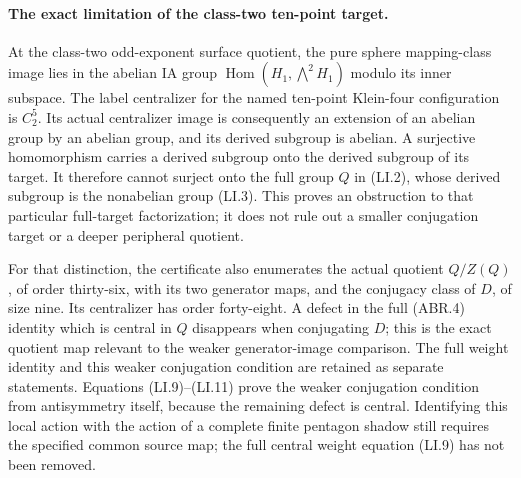 \paragraph{The exact limitation of the class-two ten-point target.}
At the class-two odd-exponent surface quotient, the pure
sphere mapping-class image lies in the abelian IA group
$\operatorname{Hom}(H_1,\bigwedge^2H_1)$ modulo its inner
subspace.  The label centralizer for the named ten-point
Klein-four configuration is $C_2^5$.  Its actual centralizer
image is consequently an extension of an abelian group by
an abelian group, and its derived subgroup is abelian.
A surjective homomorphism carries a derived subgroup onto
the derived subgroup of its target.  It therefore cannot
surject onto the full group $Q$ in (LI.2), whose derived
subgroup is the nonabelian group (LI.3).
This proves an obstruction to that particular full-target
factorization; it does not rule out a smaller conjugation
target or a deeper peripheral quotient.

For that distinction, the certificate also enumerates the
actual quotient $Q/Z(Q)$, of order thirty-six, with its two
generator maps, and the conjugacy class of $D$, of size nine.
Its centralizer has order forty-eight.  A defect in the full
(ABR.4) identity which is central in $Q$ disappears when
conjugating $D$; this is the exact quotient map relevant to
the weaker generator-image comparison.  The full weight
identity and this weaker conjugation condition are retained
as separate statements.  Equations (LI.9)--(LI.11) prove the
weaker conjugation condition from antisymmetry itself, because
the remaining defect is central.  Identifying this local
action with the action of a complete finite pentagon shadow
still requires the specified common source map; the full
central weight equation (LI.9) has not been removed.
